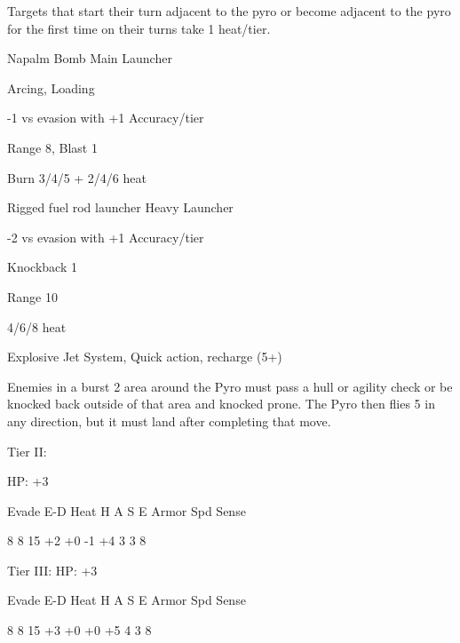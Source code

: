 Targets that start their turn adjacent to the pyro or become adjacent to the pyro for the first time  
on their turns take 1 heat/tier.
 

Napalm Bomb  
Main Launcher
 
Arcing, Loading
 
-1 vs evasion with +1 Accuracy/tier
 
Range 8, Blast 1
 
Burn 3/4/5 + 2/4/6 heat
 

Rigged fuel rod launcher  
Heavy Launcher
 
-2 vs evasion with +1 Accuracy/tier
 
Knockback 1
 
Range 10
 
4/6/8 heat
 

Explosive Jet  
System, Quick action, recharge (5+)
 
Enemies in a burst 2 area around the Pyro must pass a hull or agility check or be knocked back  
outside of that area and knocked prone. The Pyro then flies 5 in any direction, but it must land  
after completing that move.
 

Tier II:
 
HP: +3
 

          Evade    E-D    Heat    H     A    S     E       Armor        Spd      Sense 

          8        8      15      +2    +0   -1    +4       3           3         8 

Tier III:  
HP: +3
 

          Evade    E-D    Heat    H     A    S     E       Armor        Spd      Sense 

          8        8      15      +3    +0   +0    +5       4           3         8 

                                                                                                               